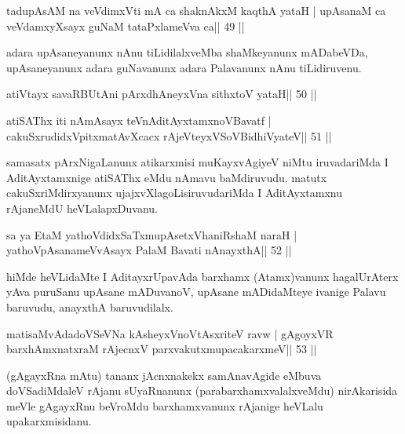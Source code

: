 
\begin{shl}
tadupAsAM na veVdimxVti mA ca shaknAkxM kaqthA yataH |
upAsanaM ca veVdamxyXsayx guNaM tataPxlameVva ca\hfill || 49 ||
\end{shl}

\begin{artha}
adara upAsaneyanunx nAnu tiLidilalxveMba shaMkeyanunx mADabeVDa, upAsaneyanunx adara guNavanunx adara Palavanunx nAnu tiLidiruvenu.
\end{artha}



\begin{shl}
atiVtayx savaRBUtAni pArxdhAneyxVna sithxtoV yataH\hfill || 50 ||
\end{shl}

\begin{shl}
atiSAThx iti nAmAsayx teVnAditAyxtamxnoV\s Bavatf |
cakuSxrudidxVpitxmatAvXcacx rAjeVteyxVSoV\s BidhiVyateV\hfill || 51 ||
\end{shl}

\begin{artha}
samasatx pArxNigaLanunx atikarxmisi muKayxvAgiyeV niMtu iruvadariMda I  AditAyxtamxnige atiSAThx eMdu nAmavu baMdiruvudu. matutx cakuSxriMdirxyanunx ujajxvXlagoLisiruvudariMda I AditAyxtamxnu rAjaneMdU heVLalapxDuvanu.
\end{artha}

\begin{shl}
sa ya EtaM yathoVdidxSaTxmupAsetxV\s haniRshaM naraH |
yathoVpAsanameVvAsayx PalaM Bavati nAnayxthA\hfill || 52 ||
\end{shl}

\begin{artha}
hiMde heVLidaMte I AditayxrUpavAda barxhamx (Atamx)vanunx hagalUrAterx yAva puruSanu upAsane mADuvanoV, upAsane mADidaMteye ivanige Palavu baruvudu, anayxthA baruvudilalx.
\end{artha}

\begin{shl}
matisaMvAdadoVSeVNa kAsheyxVnoVtAsxriteV ravw |
gAgoyxVR barxhAmxnatxraM rAjecnxV parxvakutxmupacakarxmeV\hfill || 53 ||
\end{shl}

\begin{artha}
(gAgayxRna mAtu) tananx jAcnxnakekx samAnavAgide  eMbuva doVSadiMdaleV rAjanu sUyaRnanunx (parabarxhamxvalalxveMdu) nirAkarisida meVle gAgayxRnu beVroMdu barxhamxvanunx rAjanige heVLalu upakarxmisidanu.
\end{artha} 

